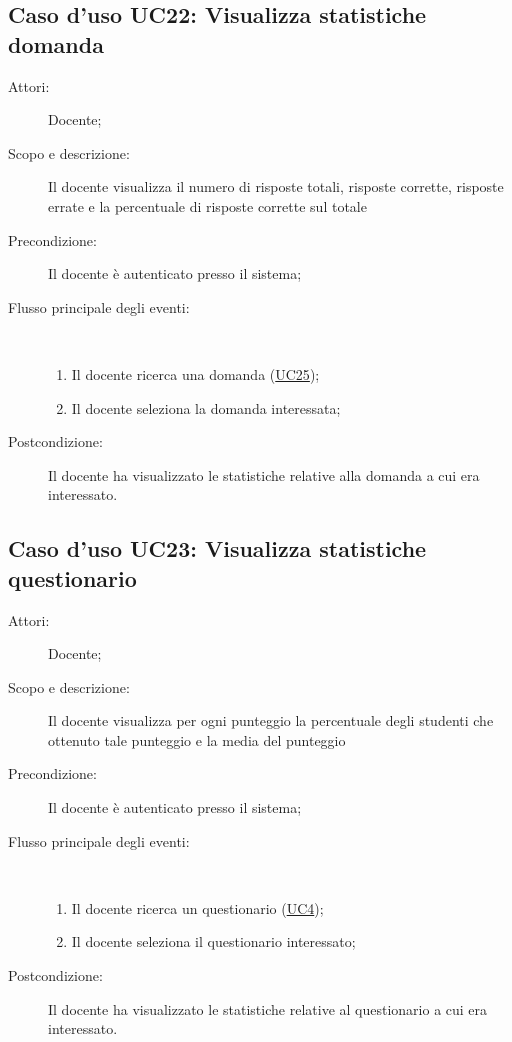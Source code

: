 \subsection{Caso d'uso UC22: Visualizza statistiche domanda}\begin{description}
	\item[Attori:] Docente;
	\item[Scopo e descrizione:] Il docente visualizza il numero di risposte totali, risposte corrette, risposte errate e la percentuale di risposte corrette sul totale
	\item[Precondizione:] Il docente è autenticato presso il sistema;
	
	\item[Flusso principale degli eventi:] \ 
	\begin{enumerate}
		\item Il docente ricerca una domanda (\hyperlink{UC25}{UC25});
		\item Il docente seleziona la domanda interessata;
		
	\end{enumerate}
	\item[Postcondizione:] Il docente ha visualizzato le statistiche relative alla domanda a cui era interessato.
\end{description}
\hypertarget{UC23}{}
\subsection{Caso d'uso UC23: Visualizza statistiche questionario}\begin{description}
	\item[Attori:] Docente;
	\item[Scopo e descrizione:] Il docente visualizza per ogni punteggio la percentuale degli studenti che ottenuto tale punteggio e la media del punteggio
	\item[Precondizione:] Il docente è autenticato presso il sistema;
	
	\item[Flusso principale degli eventi:] \ 
	\begin{enumerate}
		\item Il docente ricerca un questionario (\hyperlink{UC4}{UC4});
		\item Il docente seleziona il questionario interessato;
		
	\end{enumerate}
	\item[Postcondizione:] Il docente ha visualizzato le statistiche relative al questionario a cui era interessato.
\end{description}
\hypertarget{UC24}{}
